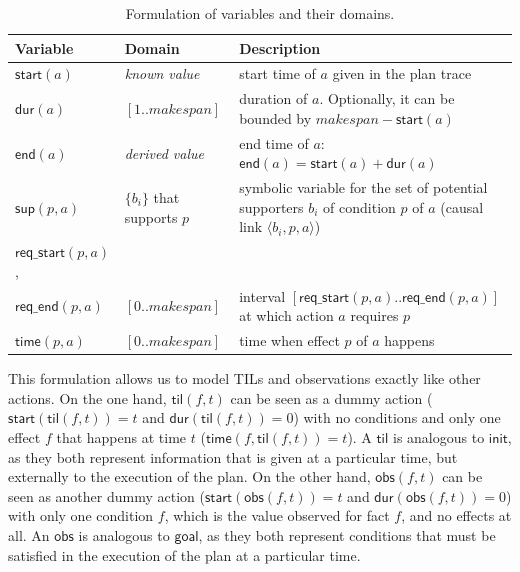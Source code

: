 \documentclass[runningheads]{llncs}
\newcommand{\tup}[1]{{\langle #1 \rangle}}
\newcommand{\dur}{\mathsf{dur}}    %
\newcommand{\obs}{\mathsf{obs}}    %
\newcommand{\start}{\mathsf{start}}%
\newcommand{\en}{\mathsf{end}}     %
\newcommand{\til}{\mathsf{til}}    %
\newcommand{\supp}{\mathsf{sup}}   %
\newcommand{\tim}{\mathsf{time}}   %
\newcommand{\reqs}{\mathsf{req\_{start}}} %
\newcommand{\reqe}{\mathsf{req\_{end}}}   %
\newcommand{\ini}{\mathsf{init}}   %
\newcommand{\goal}{\mathsf{goal}}  %
\begin{document}
\begin{table}
\begin{center}
\small
\begin{tabular}{p{2cm}p{2.7cm}p{7.4cm}}
\textbf{Variable} & \textbf{Domain} & \textbf{Description} \\

\hline


$\start(a)$ & \emph{known value} & start time of $a$ given in the plan trace \\
$\dur(a)$ & $[1..makespan]$ & duration of $a$. Optionally, it can be bounded by $makespan-\start(a)$\\
$\en(a)$ & \emph{derived value} & end time of $a$: $\en(a)=\start(a)+\dur(a)$ \\


$\supp(p,a)$ & $\{b_i\}$ that \newline supports $p$ & symbolic variable for the set of potential supporters $b_i$ of condition $p$ of $a$ (causal link $\tup{b_i,p,a}$) \\

$\reqs(p,a)$, \\
$\reqe(p,a)$ & $[0..makespan]$ & interval $[\reqs(p,a)..\reqe(p,a)]$ at which action $a$ requires $p$ \\

$\tim(p,a)$ & $[0..makespan]$ & time when effect $p$ of $a$ happens \\


\hline
\end{tabular}
\normalsize
\end{center}
\caption{Formulation of variables and their domains.}
\label{table:variables}
\end{table}

This formulation allows us to model TILs and observations exactly like other actions. On the one hand, $\til(f,t)$ can be seen as a dummy action ($\start(\til(f,t))=t$ and $\dur(\til(f,t))=0$) with no conditions and only one effect $f$ that happens at time $t$ ($\tim(f,\til(f,t))=t$). A $\til$ is analogous to $\ini$, as they both represent information that is given at a particular time, but externally to the execution of the plan. On the other hand, $\obs(f,t)$ can be seen as another dummy action ($\start(\obs(f,t))=t$ and $\dur(\obs(f,t))=0$) with only one condition $f$, which is the value observed for fact $f$, and no effects at all. An $\obs$ is analogous to $\goal$, as they both represent conditions that must be satisfied in the execution of the plan at a particular time.
\end{document}

